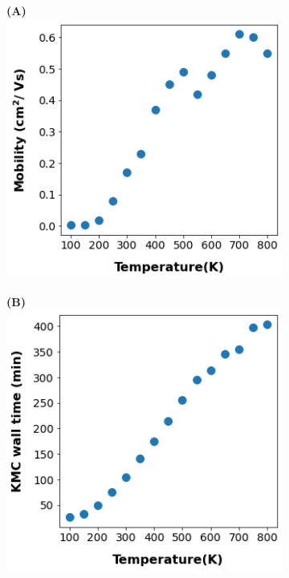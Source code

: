 \begin{figure}[]
\centering
\begin{subfigure}{.5\textwidth}
    \textbf{(A)}
    \centering
    \includegraphics[width=\textwidth]{figures/temp.png}
    \newline
\end{subfigure}%
\begin{subfigure}{.5\textwidth}
    \textbf{(B)}
    \centering
    \includegraphics[width=\textwidth]{figures/temp_simtime_plot.png}

\end{subfigure}
\end{figure}
